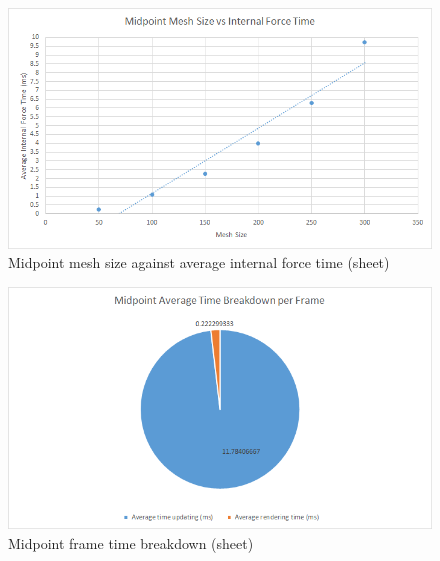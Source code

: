     \begin{figure}
    \begin{center}
      \includegraphics[scale=.9]{Figures/sheet_m_m_csf}
    \end{center}
    \caption{Midpoint mesh size against average internal force time (sheet)}
    \label{fig:m mesh csf sheet}
  \end{figure}
  
    \begin{figure}
    \begin{center}
      \includegraphics[scale=.9]{Figures/sheet_m_ft}
    \end{center}
    \caption{Midpoint frame time breakdown (sheet)}
    \label{fig:m ft sheet}
  \end{figure}
  
